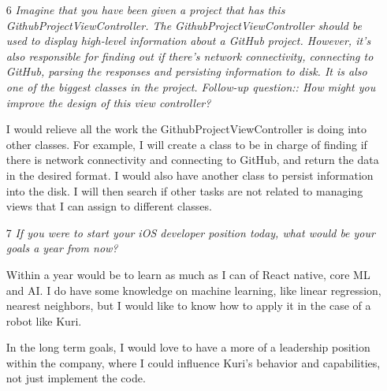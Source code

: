 \documentclass[12]{report}
\begin{document}
\begin{itemize}
\item[6] {\it Imagine that you have been given a project that has this GithubProjectViewController. The GithubProjectViewController should be used to display high-level information about a GitHub project. However, it's also responsible for finding out if there's network connectivity, connecting to GitHub, parsing the responses and persisting information to disk. It is also one of the biggest classes in the project. Follow-up question:: How might you improve the design of this view controller?}

I would relieve all the work the GithubProjectViewController is doing into other classes. For example, I will create a class to be in charge of finding if there is network connectivity and connecting to GitHub, and return the data in the desired format. I would also have another class to persist information into the disk. I will then search if other tasks are not related to managing views that I can assign to different classes. 

\item[7] {\it If you were to start your iOS developer position today, what would be your goals a year from now?}

Within a year would be to learn as much as I can of React native, core ML and  AI. I do have some knowledge on machine learning, like linear regression, nearest neighbors,  but I would like to know how to apply it in the case of a robot like Kuri. 
 
In the long term goals, I would love to have a more of a leadership position within the company,  where I could influence Kuri's behavior and capabilities, not just implement the code.

\end{itemize}





\end{document}
